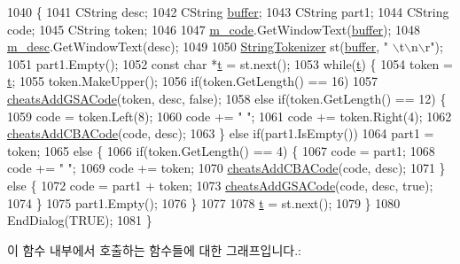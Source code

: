 \begin{DoxyCode}
1040 \{
1041   CString desc;
1042   CString \mbox{\hyperlink{_g_b_a_8cpp_a28d4d3d8445e73a696b2d6f7eadabd96}{buffer}};
1043   CString part1;
1044   CString code;
1045   CString token;
1046 
1047   \mbox{\hyperlink{class_add_c_b_a_code_ab4b404e9aed23e5dd265f543e98c9c6c}{m\_code}}.GetWindowText(\mbox{\hyperlink{_g_b_a_8cpp_a28d4d3d8445e73a696b2d6f7eadabd96}{buffer}});
1048   \mbox{\hyperlink{class_add_c_b_a_code_ab5056f88f9c1f58a20a1ce718599305b}{m\_desc}}.GetWindowText(desc);
1049   
1050   \mbox{\hyperlink{class_string_tokenizer}{StringTokenizer}} st(\mbox{\hyperlink{_g_b_a_8cpp_a28d4d3d8445e73a696b2d6f7eadabd96}{buffer}}, \textcolor{stringliteral}{" \(\backslash\)t\(\backslash\)n\(\backslash\)r"});
1051   part1.Empty();
1052   \textcolor{keyword}{const} \textcolor{keywordtype}{char} *\mbox{\hyperlink{expr_8cpp_aded116371789db1fd63c90ef00c95a3d}{t}} = st.next();
1053   \textcolor{keywordflow}{while}(\mbox{\hyperlink{expr_8cpp_aded116371789db1fd63c90ef00c95a3d}{t}}) \{
1054     token = \mbox{\hyperlink{expr_8cpp_aded116371789db1fd63c90ef00c95a3d}{t}};
1055     token.MakeUpper();
1056     \textcolor{keywordflow}{if}(token.GetLength() == 16)
1057       \mbox{\hyperlink{_cheats_8cpp_a47aded7deffcbfa36ed55944eafb72ab}{cheatsAddGSACode}}(token, desc, \textcolor{keyword}{false});
1058     \textcolor{keywordflow}{else} \textcolor{keywordflow}{if}(token.GetLength() == 12) \{
1059       code = token.Left(8);
1060       code += \textcolor{stringliteral}{" "};
1061       code += token.Right(4);
1062       \mbox{\hyperlink{_cheats_8cpp_af79d349aaea63793beec4fa2626f74c8}{cheatsAddCBACode}}(code, desc);
1063     \} \textcolor{keywordflow}{else} \textcolor{keywordflow}{if}(part1.IsEmpty())
1064       part1 = token;
1065     \textcolor{keywordflow}{else} \{
1066       \textcolor{keywordflow}{if}(token.GetLength() == 4) \{
1067         code = part1;
1068         code += \textcolor{stringliteral}{" "};
1069         code += token;
1070         \mbox{\hyperlink{_cheats_8cpp_af79d349aaea63793beec4fa2626f74c8}{cheatsAddCBACode}}(code, desc);
1071       \} \textcolor{keywordflow}{else} \{
1072         code = part1 + token;
1073         \mbox{\hyperlink{_cheats_8cpp_a47aded7deffcbfa36ed55944eafb72ab}{cheatsAddGSACode}}(code, desc, \textcolor{keyword}{true});
1074       \}
1075       part1.Empty();
1076     \}
1077 
1078     \mbox{\hyperlink{expr_8cpp_aded116371789db1fd63c90ef00c95a3d}{t}} = st.next();
1079   \}
1080   EndDialog(TRUE);
1081 \}
\end{DoxyCode}
이 함수 내부에서 호출하는 함수들에 대한 그래프입니다.\+:
